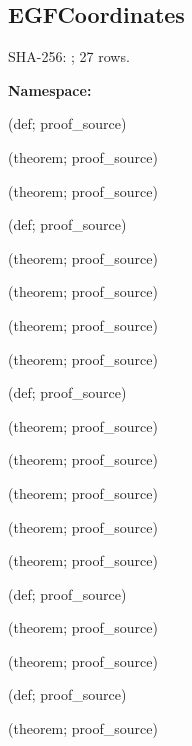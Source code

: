 \subsection*{EGFCoordinates}
{\footnotesize SHA-256: ; 27 rows.}\par
\begingroup\small
\textbf{Namespace:} \par
\noindent{} {\scriptsize (def; proof\_source)}\par
\noindent{} {\scriptsize (theorem; proof\_source)}\par
\noindent{} {\scriptsize (theorem; proof\_source)}\par
\noindent{} {\scriptsize (def; proof\_source)}\par
\noindent{} {\scriptsize (theorem; proof\_source)}\par
\noindent{} {\scriptsize (theorem; proof\_source)}\par
\noindent{} {\scriptsize (theorem; proof\_source)}\par
\noindent{} {\scriptsize (theorem; proof\_source)}\par
\noindent{} {\scriptsize (def; proof\_source)}\par
\noindent{} {\scriptsize (theorem; proof\_source)}\par
\noindent{} {\scriptsize (theorem; proof\_source)}\par
\noindent{} {\scriptsize (theorem; proof\_source)}\par
\noindent{} {\scriptsize (theorem; proof\_source)}\par
\noindent{} {\scriptsize (theorem; proof\_source)}\par
\noindent{} {\scriptsize (def; proof\_source)}\par
\noindent{} {\scriptsize (theorem; proof\_source)}\par
\noindent{} {\scriptsize (theorem; proof\_source)}\par
\noindent{} {\scriptsize (def; proof\_source)}\par
\noindent{} {\scriptsize (theorem; proof\_source)}\par
